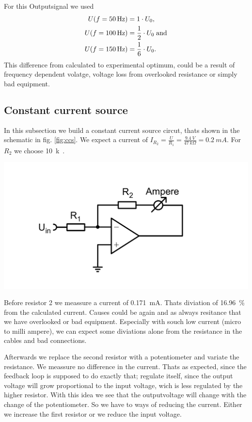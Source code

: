 \documentclass[a4paper,10pt]{article}
\newenvironment{Figure}
        {\par\medskip\noindent\minipage{\linewidth}}
        {\endminipage\par\medskip}
\numberwithin{equation}{section}
\begin{document}
\begin{multicols}{2}
\begin{Figure}
		\label{fig:foundsaw}
	\end{Figure}
	For this Outputsignal we used
	\begin{align*}
		U(f=\SI{50}{Hz})  & =1\cdot U_0\text{,}\\
    U(f=\SI{100}{Hz}) & =\frac{1}{2}\cdot U_0\text{\;and}\\
    U(f=\SI{150}{Hz}) & =\frac{1}{6}\cdot U_0\text{.}
	\end{align*}
  This difference from calculated to experimental optimum, could be a result of frequency dependent volatge, voltage loss from overlooked resistance or simply bad equipment.
  \subsection{Constant current source}
  In this subsection we build a constant current source circut, thats shown in the schematic in fig. \ref{fig:ccs}. We expect a current of $I_{R_2}=\frac{U}{R_1}=\frac{\SI{9.4}{V}}{\SI{47}{k\Omega}}=\SI{0.2}{mA}$. For $R_2$ we choose \SI{10}{k\Omega}.
	\begin{Figure}
		\centering
		\includegraphics[width=1\textwidth]{conscurrentshematic.png}
		\label{fig:ccs}
	\end{Figure}
  Before resistor 2 we meassure a current of \SI{0.171}{\milli A}. Thats diviation of \SI{16.96}{\%} from the calculated current. Causes could be again and as always resitance that we have overlooked or bad equipment. Especially with souch low current (micro to milli ampere), we can expect some diviations alone from the resistance in the cables and bad connections.

  Afterwards we replace the second resistor with a potentiometer and variate the resistance. We meassure no difference in the current. Thats as expected, since the feedback loop is supposed to do exactly that; regulate itself, since the output voltage will grow proportional to the input voltage, wich is less regulated by the higher resistor. With this idea we see that the outputvoltage will change with the change of the potentiometer. So we have to ways of reducing the current. Either we increase the first resistor or we reduce the input voltage.


\end{multicols}
\end{document}
